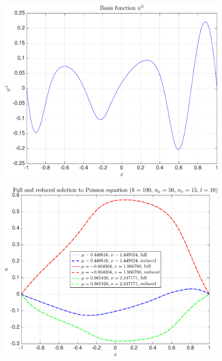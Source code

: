 \documentclass[11pt,a4paper]{article}
\theoremstyle{definition}
\theoremstyle{theorem}
\begin{document}
	\begin{figure}
		\center
		\includegraphics[scale=0.5]{fig39}
		\caption{}
	\end{figure}
	
	\begin{figure}
		\center
		\includegraphics[scale=0.5]{fig40}
		\caption{}
	\end{figure}
	
\end{document}
